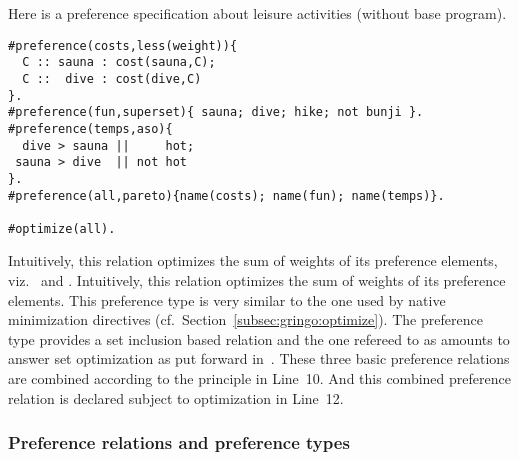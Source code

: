 \begin{example}\label{asprin:example3}
Here is %
a {preference specification} about leisure activities (without base program).
\begin{lstlisting}[escapechar=?]
#preference(costs,less(weight)){ 
  C :: sauna : cost(sauna,C); 
  C ::  dive : cost(dive,C) 
}.
#preference(fun,superset){ sauna; dive; hike; not bunji }.
#preference(temps,aso){
  dive > sauna ||     hot; 
 sauna > dive  || not hot
}.
#preference(all,pareto){name(costs); name(fun); name(temps)}.

#optimize(all).
\end{lstlisting}
Intuitively, this relation optimizes the sum of weights of its preference elements, 
viz.\  and .
Intuitively, this relation optimizes the sum of weights of its preference elements.
This preference type is very similar to the one used by native minimization directives (cf.\ Section~\ref{subsec:gringo:optimize}).
The preference type  provides a set inclusion based relation and the one refereed to as 
amounts to answer set optimization as put forward in~\cite{brnitr03a}.
These three basic preference relations are combined according to the  principle in Line~10.
And this combined preference relation is declared subject to optimization in Line~12.
\end{example}
%

\subsubsection{Preference relations and preference types}


